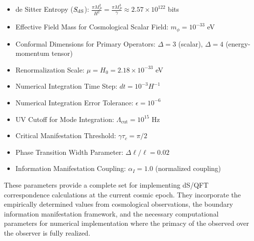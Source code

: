 \documentclass[11pt,english,twoside]{article}
\theoremstyle{plain}
\theoremstyle{definition}
\theoremstyle{remark}
\newcommand{\dS}{{\rm dS}}
\newcommand{\gammaR}{\gamma}
\begin{document}
\begin{itemize}
\item de Sitter Entropy ($S_{\dS}$): $\frac{\pi M_P^2}{H^2} = \frac{\pi M_P^3}{\gammaR} \approx 2.57 \times 10^{122}$ bits
\item Effective Field Mass for Cosmological Scalar Field: $m_\phi = 10^{-33}$ eV
\item Conformal Dimensions for Primary Operators: $\Delta = 3$ (scalar), $\Delta = 4$ (energy-momentum tensor)
\item Renormalization Scale: $\mu = H_0 = 2.18 \times 10^{-33}$ eV
\item Numerical Integration Time Step: $dt = 10^{-3} H^{-1}$
\item Numerical Integration Error Tolerance: $\epsilon = 10^{-6}$
\item UV Cutoff for Mode Integration: $\Lambda_{\text{cut}} = 10^{15}$ Hz
\item Critical Manifestation Threshold: $\gammaR\tau_c = \pi/2$
\item Phase Transition Width Parameter: $\Delta\ell/\ell = 0.02$
\item Information Manifestation Coupling: $\alpha_I = 1.0$ (normalized coupling)
\end{itemize}

These parameters provide a complete set for implementing dS/QFT correspondence calculations at the current cosmic epoch. They incorporate the empirically determined values from cosmological observations, the boundary information manifestation framework, and the necessary computational parameters for numerical implementation where the primacy of the observed over the observer is fully realized.
\end{document}
